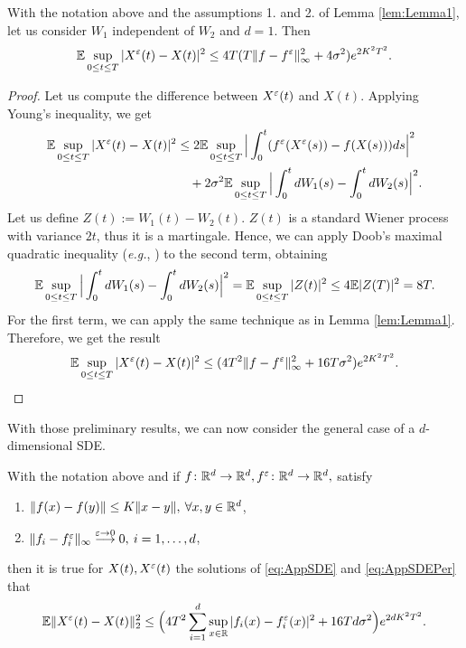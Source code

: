 \begin{lemma}\label{lem:Lemma2} With the notation above and the assumptions 1. and 2. of Lemma \ref{lem:Lemma1}, let us consider $W_1$ independent of $W_2$ and $d = 1$. Then
\begin{equation*}	
	\mathbb{E} \sup_{0 \leq t \leq T} |X^\varepsilon(t) - X(t)|^2 \leq 4T(T \|f - f^\varepsilon\|_{\infty}^2 + 4\sigma^2) e^{2K^2T^2}.
\end{equation*}
\end{lemma}

\begin{proof} Let us compute the difference between $X^\varepsilon(t)$ and $X(t)$. Applying Young's inequality, we get
\begin{equation*}
\begin{aligned}
	\mathbb{E} \sup_{0 \leq t \leq T} |X^\varepsilon(t) - X(t)|^2 &\leq 2\mathbb{E} \sup_{0 \leq t \leq T}\Big|\int_0^t (f^\varepsilon (X^\varepsilon(s)) - f(X(s)))ds \Big|^2 \\
		&\quad + 2\sigma^2 \mathbb{E} \sup_{0 \leq t \leq T} \Big|\int_0^t dW_1(s) - \int_0^t dW_2(s)  \Big|^2.
\end{aligned}
\end{equation*}
Let us define $Z(t) := W_1(t) - W_2(t)$. $Z(t)$ is a standard Wiener process with variance $2t$, thus it is a martingale. Hence, we can apply Doob's maximal quadratic inequality (\textit{e.g.}, \cite[Page 11]{Protter2004}) to the second term, obtaining
\begin{equation*}
	\mathbb{E} \sup_{0 \leq t \leq T} \Big|\int_0^t dW_1(s) - \int_0^t dW_2(s)  \Big|^2 = \mathbb{E} \sup_{0 \leq t \leq T} | Z(t) |^2 \leq 4 \mathbb{E} |Z(T)|^2 = 8T.
\end{equation*}
For the first term, we can apply the same technique as in Lemma \ref{lem:Lemma1}. Therefore, we get the result
\begin{equation*}
	\mathbb{E} \sup_{0 \leq t \leq T} |X^\varepsilon(t) - X(t)|^2 \leq (4T^2 \|f - f^\varepsilon\|_{\infty}^2 + 16T\sigma^2) e^{2K^2T^2}.
\end{equation*}
\end{proof}
\noindent With those preliminary results, we can now consider the general case of a $d$-dimensional SDE.
\begin{theorem}\label{th:Prop} With the notation above and if $f\colon \mathbb{R}^d \rightarrow \mathbb{R}^d, f^\varepsilon\colon \mathbb{R}^d \rightarrow \mathbb{R}^d,$ satisfy
\begin{enumerate}
	\item $\|f(x) - f(y)\| \leq K\|x - y\|, \: \forall x,y \in \mathbb{R}^d$,
 	\item $\|f_i - f_i^\varepsilon\|_\infty \stackrel{\varepsilon \rightarrow 0}\longrightarrow 0, \: i = 1, \dots, d$,
\end{enumerate}
then it is true for $X(t), X^\varepsilon(t)$ the solutions of \eqref{eq:AppSDE} and \eqref{eq:AppSDEPer} that 
\begin{equation}\label{eq:Proposition}
	\mathbb{E} \| X^\varepsilon(t) - X(t) \|_2^2 \leq \Big(4T^2 \sum_{i=1}^d \sup_{x\in \mathbb{R}}|f_i(x) - f_i^\varepsilon(x)|^2 + 16Td\sigma^2\Big)e^{2dK^2T^2}.
\end{equation}
\end{theorem}
